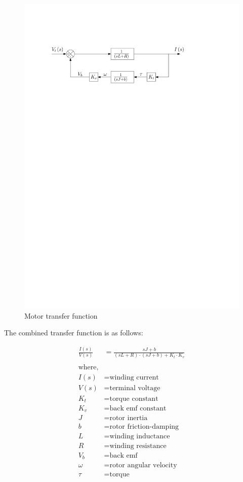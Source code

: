 \documentclass{report}
\begin{document}
\begin{figure}[h]
\centering
\includegraphics{dc_motor_transfer_fn}	
\caption{Motor transfer function}
\label{fig:dc_motor_transfer_fn}
\end{figure}


The combined transfer function is as follows:

\begin{align}
\frac{I\left(s\right)}{V\left(s\right)} &= \frac{sJ + b}{(sL + R)\cdot(sJ + b) + K_t \cdot K_v} \label{eq:motor_plant_transfer_fn} \\
\nonumber \\
\text{where,} \nonumber \\
I(s) &= \text{winding current} \nonumber \\
V(s) &= \text{terminal voltage} \nonumber \\
K_t &= \text{torque constant} \nonumber \\
K_v &= \text{back emf constant} \nonumber \\
J &= \text{rotor inertia} \nonumber\\
b &= \text{rotor friction-damping} \nonumber \\
L &= \text{winding inductance} \nonumber \\
R &= \text{winding resistance} \nonumber \\
V_b &= \text{back emf} \nonumber \\
\omega &= \text{rotor angular velocity} \nonumber \\
\tau &= \text{torque} \nonumber
\end{align}
\end{document}
